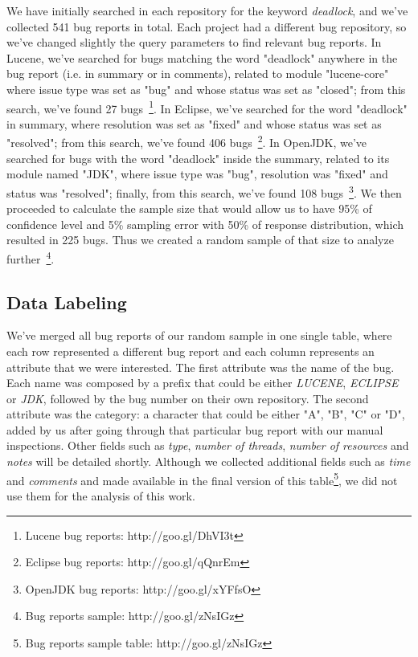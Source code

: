 We have initially searched in each repository for the keyword \emph{deadlock}, and we've collected 541 bug reports in total.
Each project had a different bug repository, so we've changed slightly the query parameters to find relevant bug reports.
In Lucene, we've searched for bugs matching the word "deadlock" anywhere in the bug report (i.e. in summary or in comments), related to module "lucene-core" where issue type was set as "bug" and whose status was set as "closed"; from this search, we've found 27 bugs~\footnote{Lucene bug reports: http://goo.gl/DhVI3t}.
In Eclipse, we've searched for the word "deadlock" in summary, where resolution was set as "fixed" and whose status was set as "resolved"; from this search, we've found 406 bugs~\footnote{Eclipse bug reports: http://goo.gl/qQnrEm}.
In OpenJDK, we've searched for bugs with the word "deadlock" inside the summary, related to its module named "JDK", where issue type was "bug", resolution was "fixed" and status was "resolved"; finally, from this search, we've found 108 bugs~\footnote{OpenJDK bug reports: http://goo.gl/xYFfsO}.
We then proceeded to calculate the sample size that would allow us to have 95\% of confidence level and 5\% sampling error with 50\% of response distribution, which resulted in 225 bugs.
Thus we created a random sample of that size to analyze further~\footnote{Bug reports sample: http://goo.gl/zNsIGz}.

\subsection{Data Labeling}

We've merged all bug reports of our random sample in one single table, where each row represented a different bug report and each column represents an attribute that we were interested.
The first attribute was the name of the bug. Each name was composed by a prefix that could be either \emph{LUCENE}, \emph{ECLIPSE} or \emph{JDK}, followed by the bug number on their own repository.
The second attribute was the category: a character that could be either "A", "B", "C" or "D", added by us after going through that particular bug report with our manual inspections.
Other fields such as \emph{type}, \emph{number of threads}, \emph{number of resources} and \emph{notes} will be detailed shortly. Although we collected additional fields such as \emph{time} and \emph{comments} and made available in the final version of this table\footnote{Bug reports sample table: http://goo.gl/zNsIGz}, we did not use them for the analysis of this work.

